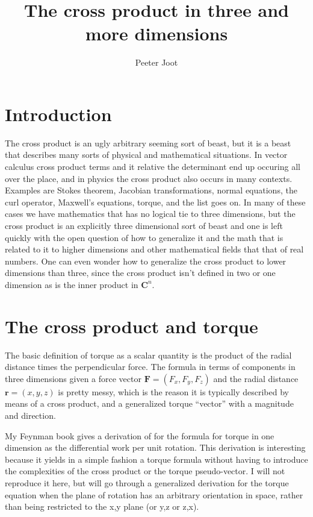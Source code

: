 \documentclass{article}      %
\title{The cross product in three and more dimensions} %
\author{Peeter Joot}         %
\newcommand{\Br}[0]{\mathbf{r}}
\newcommand{\BF}[0]{\mathbf{F}}
\newcommand{\Cn}[0]{\mathbf{C}^n}
\begin{document}

\maketitle{}

\section{Introduction}

The cross product is an ugly arbitrary seeming sort of beast, but it is a beast that 
describes many sorts of physical and mathematical situations.  In vector calculus 
cross product terms and it relative the determinant end up occuring all over the place, 
and in physics the cross product also occurs in many contexts.
Examples are Stokes theorem, Jacobian transformations, normal equations, the 
curl operator, Maxwell's equations, torque, and the list goes on.  In many of 
these cases we have mathematics that has no logical tie to three dimensions, but
the cross product is an explicitly three dimensional sort of beast and one is 
left quickly with the open question of how to generalize it and the math that
is related to it to higher dimensions and other mathematical fields that that 
of real numbers.  One can even wonder how to generalize the cross product to
lower dimensions than three, since the cross product isn't defined in two or
one dimension as is the inner product in $\Cn$.

\section{The cross product and torque}

The basic definition of torque as a scalar quantity is the product of the radial distance times 
the perpendicular force.  The formula in terms of components in three dimensions given a force vector 
$\BF = (F_x, F_y, F_z)$ and the
radial distance $\Br = (x, y, z)$ is pretty messy, which is the reason it 
is typically described by means of a cross product, and
a generalized torque ``vector'' with a magnitude and direction.

My Feynman book gives a derivation of for the formula for torque in one dimension as 
the differential work per unit rotation.  This derivation is interesting 
because it yields in a simple fashion a torque formula without having to 
introduce the complexities of the cross product or the torque pseudo-vector.  I will 
not reproduce it here, but will go through a generalized derivation for the torque 
equation when the plane of rotation has an arbitrary orientation in space, rather 
than being restricted to the x,y plane (or y,z or z,x).
\end{document}
